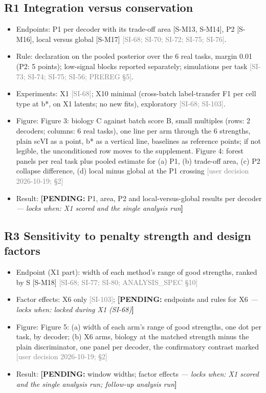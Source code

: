 \documentclass[11pt]{article}
\newcommand{\src}[1]{{\scriptsize\textcolor{gray}{[#1]}}}
\newcommand{\pending}[2]{{\color{BurntOrange}\textbf{[PENDING:} #1 \textit{--- locks when: #2}\textbf{]}}}
\begin{document}
\subsection{R1 Integration versus conservation}
\begin{itemize}
\item Endpoints: P1 per decoder with its trade-off area [S-M13, S-M14], P2 [S-M16], local versus global [S-M17] \src{SI-68; SI-70; SI-72; SI-75; SI-76}.
\item Rule: declaration on the pooled posterior over the 6 real tasks, margin 0.01 (P2: 5 points); low-signal blocks reported separately; simulations per task \src{SI-73; SI-74; SI-75; SI-56; PREREG \S5}.
\item Experiments: X1 \src{SI-68}; X10 minimal (cross-batch label-transfer F1 per cell type at b*, on X1 latents; no new fits), exploratory \src{SI-68; SI-103}.
\item Figure: Figure 3: biology C against batch score B, small multiples (rows: 2 decoders; columns: 6 real tasks), one line per arm through the 6 strengths, plain scVI as a point, b* as a vertical line, baselines as reference points; if not legible, the unconditioned row moves to the supplement. Figure 4: forest panels per real task plus pooled estimate for (a) P1, (b) trade-off area, (c) P2 collapse difference, (d) local minus global at the P1 crossing \src{user decision 2026-10-19;  \S2}
\item Result: \pending{P1, area, P2 and local-versus-global results per decoder}{X1 scored and the single analysis run}
\end{itemize}

\subsection{R3 Sensitivity to penalty strength and design factors}
\begin{itemize}
\item Endpoint (X1 part): width of each method's range of good strengths, ranked by S [S-M18] \src{SI-68; SI-77; SI-80; ANALYSIS\_SPEC \S10}
\item Factor effects: X6 only \src{SI-103}; \pending{endpoints and rules for X6}{locked during X1 (SI-68)}
\item Figure: Figure 5: (a) width of each arm's range of good strengths, one dot per task, by decoder; (b) X6 arms, biology at the matched strength minus the plain discriminator, one panel per decoder, the confirmatory contrast marked \src{user decision 2026-10-19;  \S2}
\item Result: \pending{window widths; factor effects}{X1 scored and the single analysis run; follow-up analysis run}
\end{itemize}
\end{document}
